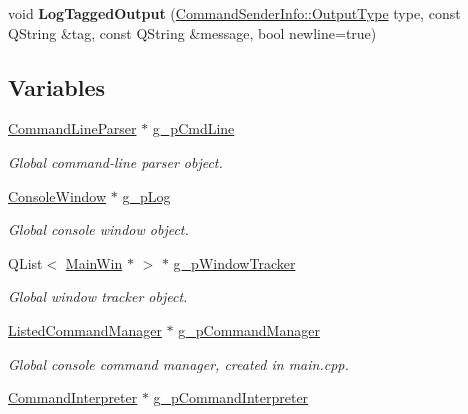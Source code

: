 \begin{DoxyCompactItemize}
\item 
\hypertarget{group___global_variables_ga63348a368c397865f05d9a17c94752c6}{void {\bfseries Log\-Tagged\-Output} (\hyperlink{class_command_sender_info_a3a5e6a2ef1772f6557f351652c2e3b60}{Command\-Sender\-Info\-::\-Output\-Type} type, const Q\-String \&tag, const Q\-String \&message, bool newline=true)}\label{group___global_variables_ga63348a368c397865f05d9a17c94752c6}

\end{DoxyCompactItemize}
\subsection*{Variables}
\begin{DoxyCompactItemize}
\item 
\hyperlink{class_command_line_parser}{Command\-Line\-Parser} $\ast$ \hyperlink{group___global_variables_ga270fc6d9322b018e011978d6376f43ba}{g\-\_\-p\-Cmd\-Line}
\begin{DoxyCompactList}\small\item\em Global command-\/line parser object. \end{DoxyCompactList}\item 
\hyperlink{class_console_window}{Console\-Window} $\ast$ \hyperlink{group___global_variables_gae2d76408535137add345d6e4258c5a07}{g\-\_\-p\-Log}
\begin{DoxyCompactList}\small\item\em Global console window object. \end{DoxyCompactList}\item 
Q\-List$<$ \hyperlink{class_main_win}{Main\-Win} $\ast$ $>$ $\ast$ \hyperlink{group___global_variables_gab5d481b5087f9956e533067ad8001d78}{g\-\_\-p\-Window\-Tracker}
\begin{DoxyCompactList}\small\item\em Global window tracker object. \end{DoxyCompactList}\item 
\hyperlink{class_listed_command_manager}{Listed\-Command\-Manager} $\ast$ \hyperlink{group___global_variables_ga4d39defaa5d22f29bde4c75d590bd0fe}{g\-\_\-p\-Command\-Manager}
\begin{DoxyCompactList}\small\item\em Global console command manager, created in main.\-cpp. \end{DoxyCompactList}\item 
\hypertarget{group___global_variables_ga347a4723fad5c3711958f787dfc93fa4}{\hyperlink{class_command_interpreter}{Command\-Interpreter} $\ast$ \hyperlink{group___global_variables_ga347a4723fad5c3711958f787dfc93fa4}{g\-\_\-p\-Command\-Interpreter}}\label{group___global_variables_ga347a4723fad5c3711958f787dfc93fa4}


\end{DoxyCompactItemize}
